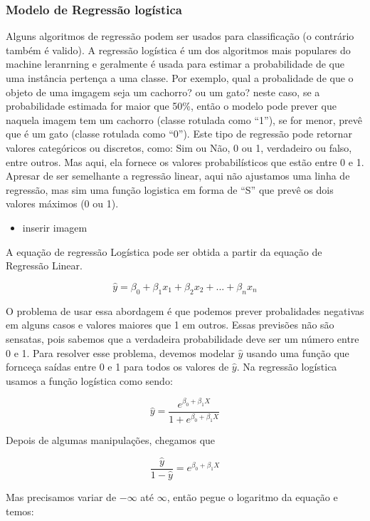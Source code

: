 \documentclass[
  letterpaper,
  DIV=11,
  numbers=noendperiod]{scrreprt}
\providecommand{\tightlist}{%
  \setlength{\itemsep}{0pt}\setlength{\parskip}{0pt}}\usepackage{longtable,booktabs,array}
\begin{document}
\hypertarget{modelo-de-regressuxe3o-loguxedstica}{%
\subsubsection{Modelo de Regressão
logística}\label{modelo-de-regressuxe3o-loguxedstica}}

Alguns algoritmos de regressão podem ser usados para classificação (o
contrário também é valido). A regressão logística é um dos algoritmos
mais populares do machine leranrning e geralmente é usada para estimar a
probabilidade de que uma instância pertença a uma classe. Por exemplo,
qual a probalidade de que o objeto de uma imgagem seja um cachorro? ou
um gato? neste caso, se a probabilidade estimada for maior que 50\%,
então o modelo pode prever que naquela imagem tem um cachorro (classe
rotulada como ``1''), se for menor, prevê que é um gato (classe rotulada
como ``0''). Este tipo de regressão pode retornar valores categóricos ou
discretos, como: Sim ou Não, 0 ou 1, verdadeiro ou falso, entre outros.
Mas aqui, ela fornece os valores probabilísticos que estão entre 0 e 1.
Apresar de ser semelhante a regressão linear, aqui não ajustamos uma
linha de regressão, mas sim uma função logistica em forma de ``S'' que
prevê os dois valores máximos (0 ou 1).

\begin{itemize}
\tightlist
\item
  inserir imagem
\end{itemize}

A equação de regressão Logística pode ser obtida a partir da equação de
Regressão Linear.

\[
\hat y = \beta_0 + \beta_1x_1 + \beta_2x_2 + ...+ \beta_nx_n
\]

O problema de usar essa abordagem é que podemos prever probalidades
negativas em alguns casos e valores maiores que 1 em outros. Essas
previsões não são sensatas, pois sabemos que a verdadeira probabilidade
deve ser um número entre 0 e 1. Para resolver esse problema, devemos
modelar \(\hat y\) usando uma função que fornceça saídas entre 0 e 1
para todos os valores de \(\hat y\). Na regressão logística usamos a
função logística como sendo:

\[
\hat y = \frac{e^{\beta_0+\beta_1X}}{1 + e^{\beta_0+\beta_1X}}
\]

Depois de algumas manipulações, chegamos que

\[
\frac{\hat y}{1- \hat y} = e^{\beta_0+\beta_1X}
\]

Mas precisamos variar de \(-\infty\) até \(\infty\), então pegue o
logaritmo da equação e temos:
\end{document}

